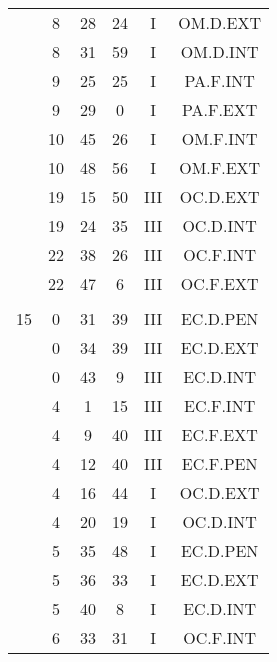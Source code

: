 \documentclass[12pt, a4paper]{article}
\begin{document}
\begin{multicols}{3}
{\begin{tabular}{c c c c c c}
	 	 	 	 & 8 & 28 & 24 & I & OM.D.EXT\\%
	 	 	 	 & 8 & 31 & 59 & I & OM.D.INT\\%
	 	 	 	 & 9 & 25 & 25 & I & PA.F.INT\\%
	 	 	 	 & 9 & 29 & 0 & I & PA.F.EXT\\%
	 	 	 	 & 10 & 45 & 26 & I & OM.F.INT\\%
	 	 	 	 & 10 & 48 & 56 & I & OM.F.EXT\\%
	 	 	 	 & 19 & 15 & 50 & III & OC.D.EXT\\%
	 	 	 	 & 19 & 24 & 35 & III & OC.D.INT\\%
	 	 	 	 & 22 & 38 & 26 & III & OC.F.INT\\%
	 	 	 	 & 22 & 47 & 6 & III & OC.F.EXT\\%
	 	 	 	 & & & & & \\%
	 	 	 	15 & 0 & 31 & 39 & III & EC.D.PEN\\%
	 	 	 	 & 0 & 34 & 39 & III & EC.D.EXT\\%
	 	 	 	 & 0 & 43 & 9 & III & EC.D.INT\\%
	 	 	 	 & 4 & 1 & 15 & III & EC.F.INT\\%
	 	 	 	 & 4 & 9 & 40 & III & EC.F.EXT\\%
	 	 	 	 & 4 & 12 & 40 & III & EC.F.PEN\\%
	 	 	 	 & 4 & 16 & 44 & I & OC.D.EXT\\%
	 	 	 	 & 4 & 20 & 19 & I & OC.D.INT\\%
	 	 	 	 & 5 & 35 & 48 & I & EC.D.PEN\\%
	 	 	 	 & 5 & 36 & 33 & I & EC.D.EXT\\%
	 	 	 	 & 5 & 40 & 8 & I & EC.D.INT\\%
	 	 	 	 & 6 & 33 & 31 & I & OC.F.INT\\%

\end{tabular}}
\end{multicols}
\end{document}
